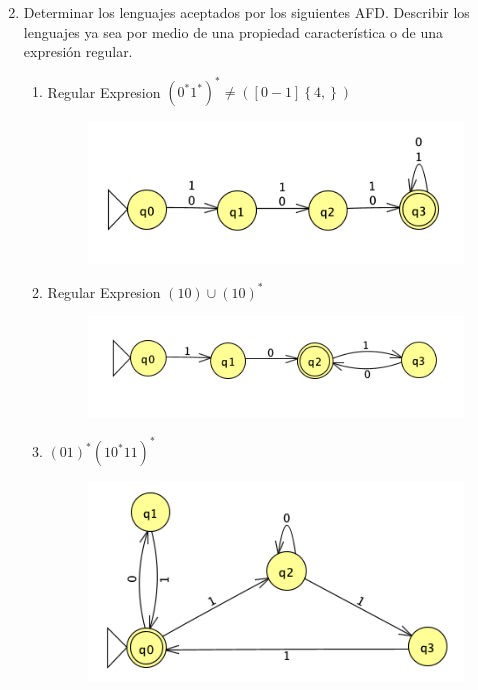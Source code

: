 \documentclass[
	12pt, %
]{fphw}
\begin{document}
\newpage
\begin{enumerate}
  \setcounter{enumi}{1}
\item Determinar los lenguajes aceptados por los siguientes AFD. Describir los lenguajes ya sea por medio de una propiedad característica o de una expresión regular.
  \begin{enumerate}[i]
  \item Regular Expresion $\left(0^{*}1^{*}\right)^{*} \neq ([0-1]\left\lbrace 4, \right\rbrace)$\\
    \begin{figure}[H]
      \centering
      \includegraphics[width=\linewidth]{images/graph1.png}
    \end{figure}
  \item Regular Expresion $\left(10\right)\cup\left(10\right)^{*}$\\
    \begin{figure}[H]
      \centering
      \includegraphics[width=\linewidth]{images/graph2.png}
    \end{figure}
    \newpage
  \item $(01)^{*}(10^{*}11)^{*}$\\
    \begin{figure}[H]
      \centering
      \includegraphics[width=\linewidth]{images/graph3.png}

\end{figure}
\end{enumerate}
\end{enumerate}
\end{document}
